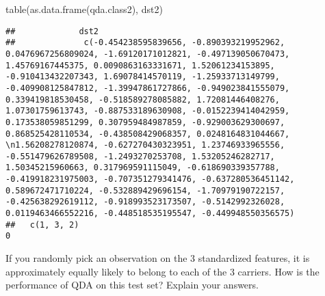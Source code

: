 \documentclass[
  11pt,
]{article}
\newenvironment{Shaded}{\begin{snugshade}}{\end{snugshade}}
\newcommand{\FunctionTok}[1]{\textcolor[rgb]{0.00,0.00,0.00}{#1}}
\newcommand{\NormalTok}[1]{#1}
\begin{document}
\begin{Shaded}
\begin{Highlighting}[]
\FunctionTok{table}\NormalTok{(}\FunctionTok{as.data.frame}\NormalTok{(qda.class2), dst2)}
\end{Highlighting}
\end{Shaded}

\begin{verbatim}
##             dst2
##              c(-0.454238595839656, -0.890393219952962, 0.0476967256809024, -1.69120171012821, -0.497139050670473, 1.45769167445375, 0.0090863163331671, 1.52061234153895, -0.910413432207343, 1.69078414570119, -1.25933713149799, -0.409908125847812, -1.39947861727866, -0.949023841555079, 0.339419818530458, -0.518589278085882, 1.72081446408276, 1.07301759613743, -0.887533189630908, -0.0152239414042959, 0.173538059851299, 0.307959484987859, -0.929003629300697, 0.868525428110534, -0.438508429068357, 0.0248164831044667, \n1.56208278120874, -0.627270430323951, 1.23746933965556, -0.551479626789508, -1.2493270253708, 1.53205246282717, 1.50345215960663, 0.317969591115049, -0.618690339357788, -0.419918231975003, -0.707351279341476, -0.637280536451142, 0.589672471710224, -0.532889429696154, -1.70979190722157, -0.425638292619112, -0.918993523173507, -0.5142992326028, 0.0119463466552216, -0.448518535195547, -0.449948550356575)
##   c(1, 3, 2)                                                                                                                                                                                                                                                                                                                                                                                                                                                                                                                                                                                                                                                                                                                                                                                                                                                                                                                                                0
\end{verbatim}

If you randomly pick an observation on the 3 standardized features, it
is approximately equally likely to belong to each of the 3 carriers. How
is the performance of QDA on this test set? Explain your answers.
\end{document}
